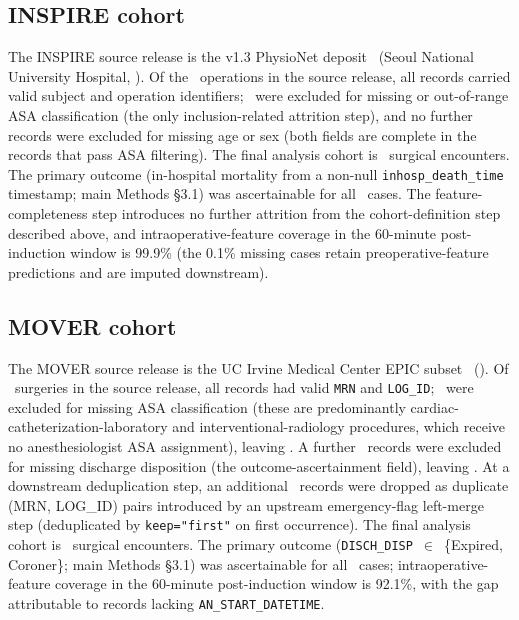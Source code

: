 \documentclass[11pt,a4paper]{article}
\begin{document}
\subsection{INSPIRE cohort}\label{supp:s1-inspire}
The INSPIRE source release is the v1.3 PhysioNet deposit~\cite{Lim2024}
(Seoul National University Hospital, \pnInspireDateRange). Of the
\pnConsortInspireSource\ operations in the source release,
all records carried valid subject and operation identifiers;
\pnConsortInspireExcludedAsa\ were excluded for missing or
out-of-range ASA classification (the only inclusion-related attrition step),
and no further records were excluded for missing age or sex (both fields are
complete in the records that pass ASA filtering). The final analysis cohort
is \pnConsortInspireFinal\ surgical encounters. The primary outcome
(in-hospital mortality from a non-null \texttt{inhosp\_death\_time}
timestamp; main Methods \S3.1) was ascertainable for all
\pnConsortInspireFinal\ cases. The feature-completeness step introduces no
further attrition from the cohort-definition step described above, and
intraoperative-feature coverage in the 60-minute post-induction window is
99.9\% (the 0.1\% missing cases retain preoperative-feature predictions and
are imputed downstream).

\subsection{MOVER cohort}\label{supp:s1-mover}
The MOVER source release is the UC Irvine Medical Center EPIC subset~\cite{Samad2023}
(\pnMoverDateRange). Of \pnConsortMoverSource\ surgeries in
the source release, all records had valid \texttt{MRN} and
\texttt{LOG\_ID}; \pnConsortMoverExcludedAsa\ were excluded for missing ASA
classification (these are predominantly cardiac-catheterization-laboratory
and interventional-radiology procedures, which receive no anesthesiologist
ASA assignment), leaving \pnConsortMoverPostAsa. A further
\pnConsortMoverExcludedDischDisp\ records were excluded for missing
discharge disposition (the outcome-ascertainment field), leaving
\pnConsortMoverPostDischDisp. At a downstream deduplication step, an
additional \pnConsortMoverExcludedDedup\ records were dropped as duplicate
(MRN, LOG\_ID) pairs introduced by an upstream emergency-flag left-merge
step (deduplicated by \texttt{keep="first"} on first occurrence). The
final analysis cohort is \pnConsortMoverFinal\ surgical encounters. The primary outcome
(\texttt{DISCH\_DISP}~$\in$~\{Expired, Coroner\}; main Methods \S3.1) was
ascertainable for all \pnConsortMoverFinal\ cases; intraoperative-feature
coverage in the 60-minute post-induction window is 92.1\%, with the gap
attributable to records lacking \texttt{AN\_START\_DATETIME}.
\end{document}
